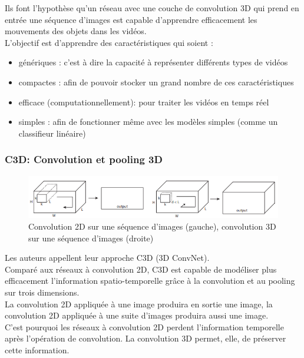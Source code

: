\documentclass[11pt]{article}
\begin{document}
Ils font l'hypothèse qu'un réseau avec une couche de convolution 3D qui prend en entrée une séquence d'images est capable d'apprendre efficacement les mouvements des objets dans les vidéos.\\

L'objectif est d'apprendre des caractéristiques qui soient :\\
\begin{itemize}
\item génériques : c'est à dire la capacité à représenter différents types de vidéos\\
\item compactes : afin de pouvoir stocker un grand nombre de ces caractéristiques\\
\item efficace (computationnellement): pour traiter les vidéos en temps réel\\
\item simples : afin de fonctionner même avec les modèles simples (comme un classifieur linéaire)\\
\end{itemize}

\subsubsection{C3D: Convolution et pooling 3D}
\label{sec:orgdce76f2}
\begin{figure}[htbp]
\centering
\includegraphics[width=.9\linewidth]{c3d_idea.png}
\caption{Convolution 2D sur une séquence d'images (gauche), convolution 3D sur une séquence d'images (droite) \label{c3d-idea}}
\end{figure}
Les auteurs appellent leur approche C3D (3D ConvNet).\\
Comparé aux réseaux à convolution 2D, C3D est capable de modéliser plus efficacement l'information spatio-temporelle grâce à la convolution et au pooling sur trois dimensions.\\
La convolution 2D appliquée à une image produira en sortie une image, la convolution 2D appliquée à une suite d'images produira aussi une image.\\
C'est pourquoi les réseaux à convolution 2D perdent l'information temporelle après l'opération de convolution. La convolution 3D permet, elle, de préserver cette information.\\
\end{document}
